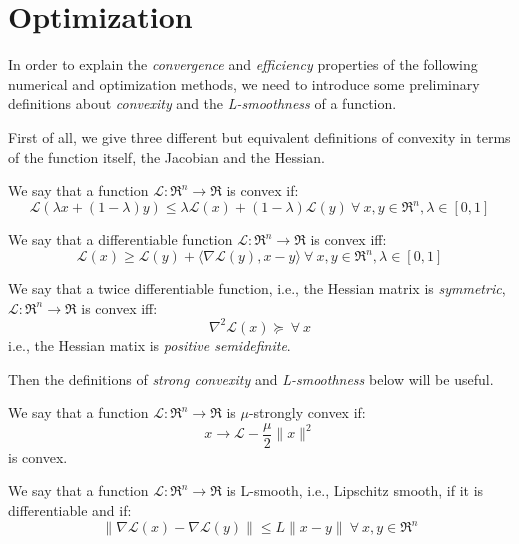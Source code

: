 \section{Optimization}

In order to explain the \emph{convergence} and \emph{efficiency} properties of the following numerical and optimization methods, we need to introduce some preliminary definitions about \emph{convexity} and the \emph{L-smoothness} of a function.

First of all, we give three different but equivalent definitions of convexity in terms of the function itself, the Jacobian and the Hessian.

\begin{definition}[Convexity]
We say that a function $\mathcal{L}: \Re^{n} \rightarrow \Re$ is convex if: 
$$ 
\mathcal{L}(\lambda x + (1 - \lambda) y ) \leq \lambda \mathcal{L}(x) + (1 - \lambda) \mathcal{L}(y) \ \forall \ x, y \in \Re^{n}, \lambda \in [0,1] 
$$
\end{definition}

\begin{definition}
We say that a differentiable function $\mathcal{L}: \Re^{n} \rightarrow \Re$ is convex iff: 
$$
\mathcal{L}(x) \geq \mathcal{L}(y) + \langle \nabla \mathcal{L}(y), x - y \rangle \ \forall \ x, y \in \Re^{n}, \lambda \in [0,1] 
$$
\end{definition}

\begin{definition}
We say that a twice differentiable function, i.e., the Hessian matrix is \emph{symmetric}, $\mathcal{L}: \Re^{n} \rightarrow \Re$ is convex iff: 
$$
\nabla^2 \mathcal{L}(x) \succeq \ \forall \ x
$$
i.e., the Hessian matix is \emph{positive semidefinite}.
\end{definition}

Then the definitions of \emph{strong convexity} and \emph{L-smoothness} below will be useful.

\begin{definition}
We say that a function $\mathcal{L}: \Re^{n} \rightarrow \Re$ is $\mu$-strongly convex if:
$$
x \rightarrow \mathcal{L} - \frac{\mu}{2} \| x \|^2
$$
is convex.
\end{definition}

\begin{definition}[L-smoothness]
We say that a function $\mathcal{L}: \Re^{n} \rightarrow \Re$ is L-smooth, i.e., Lipschitz smooth, if it is differentiable and if:
$$
\| \nabla \mathcal{L}(x) - \nabla \mathcal{L}(y) \| \leq L \| x - y \| \ \forall \ x, y \in \Re^{n}
$$
\end{definition}

